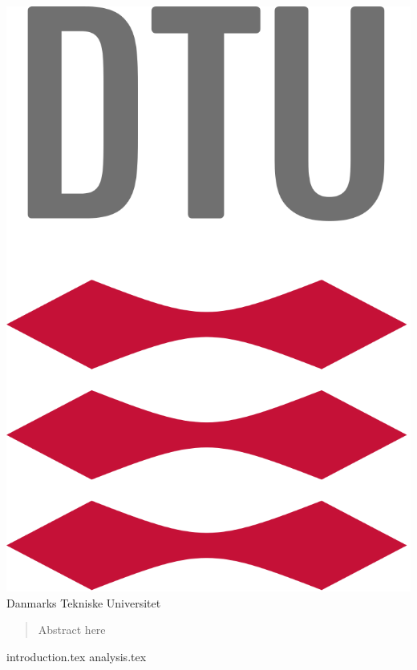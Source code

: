 \documentclass{article}
\begin{document}
\maketitle
\begin{center}
	\vspace{1cm}
	\includegraphics[scale=0.2]{dtulogo}\\
	\LARGE
	Danmarks Tekniske Universitet\\
\end{center}
\newpage


\begin{abstract}
    Abstract here
\end{abstract}
\newpage

\tableofcontents
\newpage

{introduction.tex}
{analysis.tex}

\BackMatter
\end{document}
